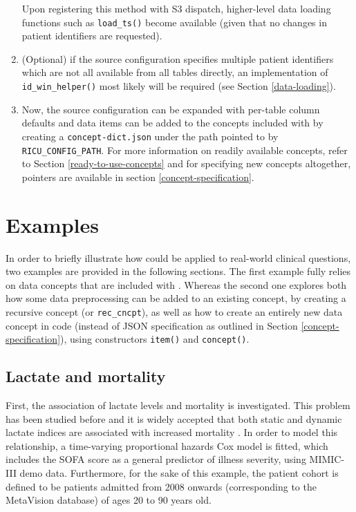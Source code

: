 \documentclass[
  notitle,
  nojss,
  noheadings]{jss}
\begin{document}
\begin{enumerate}
  Upon registering this method with S3 dispatch, higher-level data
  loading functions such as \texttt{load\_ts()} become available (given
  that no changes in patient identifiers are requested).
\item
  (Optional) if the source configuration specifies multiple patient
  identifiers which are not all available from all tables directly, an
  implementation of \texttt{id\_win\_helper()} most likely will be
  required (see Section \ref{data-loading}).
\item
  Now, the source configuration can be expanded with per-table column
  defaults and data items can be added to the concepts included with
   by creating a \texttt{concept-dict.json} under the path
  pointed to by \texttt{RICU\_CONFIG\_PATH}. For more information on
  readily available concepts, refer to Section
  \ref{ready-to-use-concepts} and for specifying new concepts
  altogether, pointers are available in section
  \ref{concept-specification}.
\end{enumerate}

\hypertarget{examples}{%
\section{Examples}\label{examples}}

In order to briefly illustrate how  could be applied to
real-world clinical questions, two examples are provided in the
following sections. The first example fully relies on data concepts that
are included with . Whereas the second one explores both how
some data preprocessing can be added to an existing concept, by creating
a recursive concept (or \texttt{rec\_cncpt}), as well as how to create
an entirely new data concept in code (instead of JSON specification as
outlined in Section \ref{concept-specification}), using constructors
\texttt{item()} and \texttt{concept()}.

\hypertarget{lactate-and-mortality}{%
\subsection{Lactate and mortality}\label{lactate-and-mortality}}

First, the association of lactate levels and mortality is investigated.
This problem has been studied before and it is widely accepted that both
static and dynamic lactate indices are associated with increased
mortality \citep{haas2016, nichol2011, van2013}. In order to model this
relationship, a time-varying proportional hazards Cox model
\citep{therneau2000, therneau2015} is fitted, which includes the SOFA
score as a general predictor of illness severity, using MIMIC-III demo
data. Furthermore, for the sake of this example, the patient cohort is
defined to be patients admitted from 2008 onwards (corresponding to the
MetaVision database) of ages 20 to 90 years old.
\end{document}
